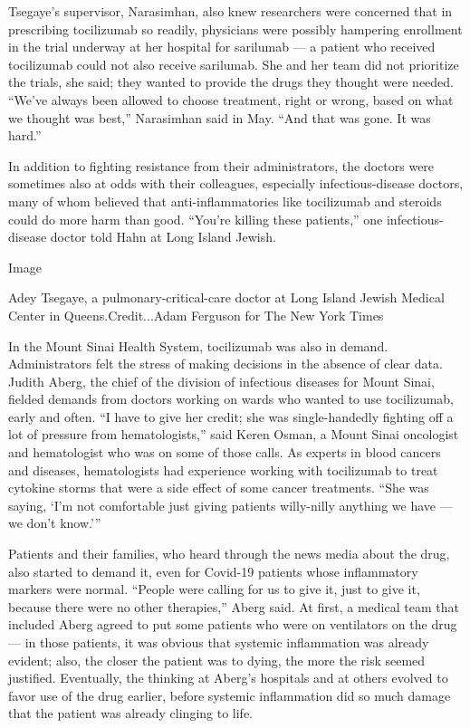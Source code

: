 Tsegaye's supervisor, Narasimhan, also knew researchers were concerned
that in prescribing tocilizumab so readily, physicians were possibly
hampering enrollment in the trial underway at her hospital for sarilumab
--- a patient who received tocilizumab could not also receive sarilumab.
She and her team did not prioritize the trials, she said; they wanted to
provide the drugs they thought were needed. ``We've always been allowed
to choose treatment, right or wrong, based on what we thought was
best,'' Narasimhan said in May. ``And that was gone. It was hard.''

In addition to fighting resistance from their administrators, the
doctors were sometimes also at odds with their colleagues, especially
infectious-disease doctors, many of whom believed that
anti-inflammatories like tocilizumab and steroids could do more harm
than good. ``You're killing these patients,'' one infectious-disease
doctor told Hahn at Long Island Jewish.

Image

Adey Tsegaye, a pulmonary-critical-care doctor at Long Island Jewish
Medical Center in Queens.Credit...Adam Ferguson for The New York Times

In the Mount Sinai Health System, tocilizumab was also in demand.
Administrators felt the stress of making decisions in the absence of
clear data. Judith Aberg, the chief of the division of infectious
diseases for Mount Sinai, fielded demands from doctors working on wards
who wanted to use tocilizumab, early and often. ``I have to give her
credit; she was single-handedly fighting off a lot of pressure from
hematologists,'' said Keren Osman, a Mount Sinai oncologist and
hematologist who was on some of those calls. As experts in blood cancers
and diseases, hematologists had experience working with tocilizumab to
treat cytokine storms that were a side effect of some cancer treatments.
``She was saying, `I'm not comfortable just giving patients willy-nilly
anything we have --- we don't know.'''

Patients and their families, who heard through the news media about the
drug, also started to demand it, even for Covid-19 patients whose
inflammatory markers were normal. ``People were calling for us to give
it, just to give it, because there were no other therapies,'' Aberg
said. At first, a medical team that included Aberg agreed to put some
patients who were on ventilators on the drug --- in those patients, it
was obvious that systemic inflammation was already evident; also, the
closer the patient was to dying, the more the risk seemed justified.
Eventually, the thinking at Aberg's hospitals and at others evolved to
favor use of the drug earlier, before systemic inflammation did so much
damage that the patient was already clinging to life.


